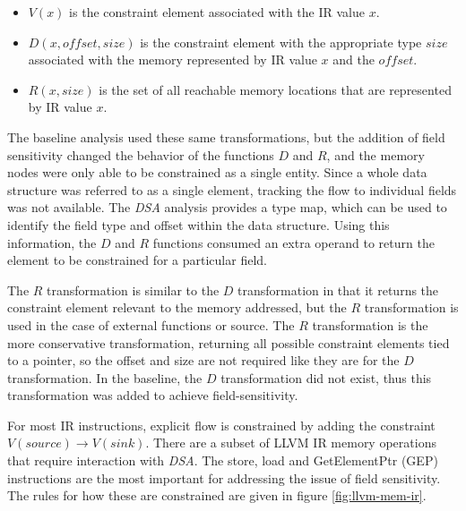    \begin{itemize}
   \item $V(x)$ is the constraint element associated with the IR value $x$.
   \item $D(x, offset, size)$ is the constraint element with the appropriate
     type $size$ associated with the memory represented by IR value $x$ and the
     $offset$.
   \item $R(x, size)$ is the set of all reachable memory locations that are
     represented by IR value $x$.
   \end{itemize}

   The baseline analysis used these same transformations, but the addition
   of field sensitivity changed the behavior of the functions $D$ and $R$, and the
   memory nodes were only able to be constrained as a single entity.
   Since a whole data structure was referred to as a single element, tracking
   the flow to individual fields was not available. The \textit{DSA} analysis
   provides a type map, which can be used to identify the field type and offset
   within the data structure. Using this information, the $D$ and $R$ functions
   consumed an extra operand to return the element to be constrained for a
   particular field.

   The $R$ transformation is similar to the $D$ transformation in that it
   returns the constraint element relevant to the memory addressed, but the $R$
   transformation is used in the case of external functions or source. The $R$
   transformation is the more conservative transformation, returning all possible
   constraint elements tied to a pointer, so the offset and size are not
   required like they are for the $D$ transformation. In the baseline, the $D$
   transformation did not exist, thus this transformation was added to achieve
   field-sensitivity.

   For most IR instructions, explicit flow is constrained by adding the
   constraint $V(source) \rightarrow V(sink)$. There are a subset of LLVM IR
   memory operations that require interaction with \textit{DSA}. The
   store, load and GetElementPtr (GEP) instructions are the most important for
   addressing the issue of field sensitivity. The rules for how these are
   constrained are given in figure \ref{fig:llvm-mem-ir}.

